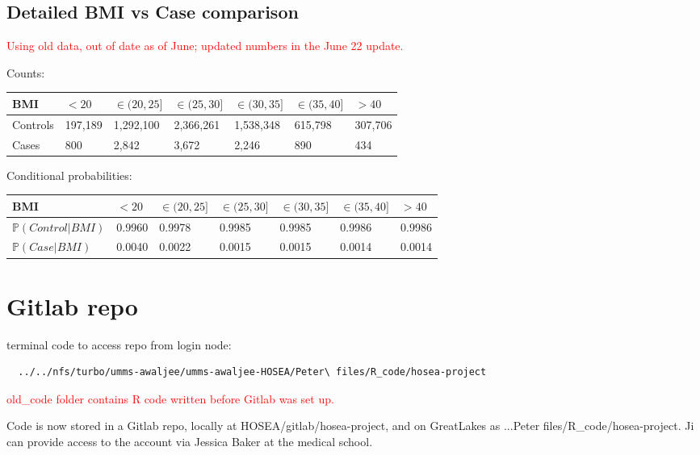 \documentclass[12pt]{article}
\newcommand{\note}[1]{\textcolor{red}{#1}}
\begin{document}
\subsection*{Detailed BMI vs Case comparison}

\note{Using old data, out of date as of June; updated numbers in the June 22 update.}

Counts:
\begin{center}
\begin{tabular}{|l|l|l|l|l|l|l|}
\hline
 \textbf{BMI} & $< 20$ & $\in (20,25]$ & $\in (25,30]$ & $\in (30,35]$ & $\in (35,40]$ & $> 40$  \\ \hline
Controls & 197,189 & 1,292,100 & 2,366,261 & 1,538,348 & 615,798 & 307,706 \\ \hline
Cases & 800 & 2,842 & 3,672 & 2,246 & 890 & 434 \\ \hline
\end{tabular}
\end{center}

Conditional probabilities:
\begin{center}
\begin{tabular}{|l|l|l|l|l|l|l|}
\hline
 \textbf{BMI} & $< 20$ & $\in (20,25]$ & $\in (25,30]$ & $\in (30,35]$ & $\in (35,40]$ & $> 40$  \\ \hline
$\mathbb{P}(Control | BMI)$ & 0.9960 & 0.9978 & 0.9985 & 0.9985 & 0.9986 & 0.9986 \\ \hline
$\mathbb{P}(Case | BMI)$ & 0.0040 & 0.0022 & 0.0015 & 0.0015 & 0.0014 & 0.0014 \\ \hline
\end{tabular}
\end{center}

\section*{Gitlab repo}

terminal code to access repo from login node:

\begin{verbatim}
  ../../nfs/turbo/umms-awaljee/umms-awaljee-HOSEA/Peter\ files/R_code/hosea-project
\end{verbatim}

\note{old\_code folder contains R code written before Gitlab was set up.}

Code is now stored in a Gitlab repo, locally at HOSEA/gitlab/hosea-project, and on GreatLakes as ...Peter files/R\_code/hosea-project. Ji can provide access to the account via Jessica Baker at the medical school.
\end{document}
